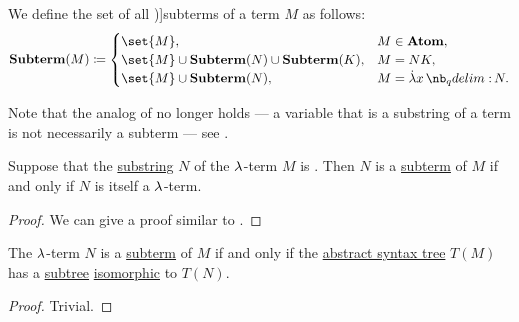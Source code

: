\begin{definition}\label{def:lambda_subterm}
  We define the set of all \term[ru=подтерм (\cite[189]{Герасимов2011Вычислимость})]{subterms} of a term \( M \) as follows:
  \begin{equation*}
    \op*{Subterm}(M) \coloneqq \begin{cases}
      \set{ M },                                             &M \in \op*{Atom}, \\
      \set{ M } \cup \op*{Subterm}(N) \cup \op*{Subterm}(K), &M = N K, \\
      \set{ M } \cup \op*{Subterm}(N),                       &M = \qabs x N.
    \end{cases}
  \end{equation*}
\end{definition}
\begin{comments}
  \item Note that the analog of  no longer holds --- a variable that is a substring of a term is not necessarily a subterm --- see .
\end{comments}

\begin{proposition}\label{thm:lambda_subterm_characterization}
  Suppose that the \hyperref[def:formal_language/substring]{substring} \( N \) of the \( {\mathrm \lambda} \)-term \( M \) is . Then \( N \) is a \hyperref[def:lambda_subterm]{subterm} of \( M \) if and only if \( N \) is itself a \( {\mathrm \lambda} \)-term.
\end{proposition}
\begin{proof}
  We can give a proof similar to .
\end{proof}

\begin{proposition}\label{thm:lambda_term_ast_subterm}
  The \( {\mathrm \lambda} \)-term \( N \) is a \hyperref[def:lambda_subterm]{subterm} of \( M \) if and only if the \hyperref[def:lambda_term_ast]{abstract syntax tree} \( T(M) \) has a \hyperref[def:tree/subtree]{subtree} \hyperref[def:labeled_tree/homomorphism]{isomorphic} to \( T(N) \).
\end{proposition}
\begin{proof}
  Trivial.
\end{proof}


